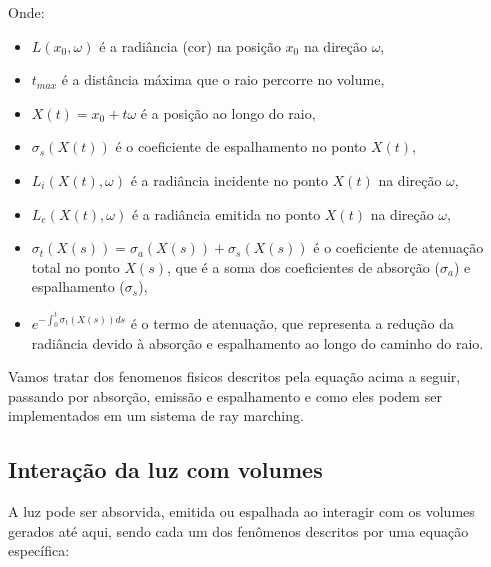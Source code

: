 Onde:
\begin{itemize}
  \item $L(x_0, \omega)$ é a radiância (cor) na posição $x_0$ na direção $\omega$,
  \item $t_{max}$ é a distância máxima que o raio percorre no volume,
  \item $X(t) = x_0 + t\omega$ é a posição ao longo do raio,
  \item $\sigma_s(X(t))$ é o coeficiente de espalhamento no ponto $X(t)$,
  \item $L_i(X(t), \omega)$ é a radiância incidente no ponto $X(t)$ na direção $\omega$,
  \item $L_e(X(t), \omega)$ é a radiância emitida no ponto $X(t)$ na direção $\omega$,
  \item $\sigma_t(X(s)) = \sigma_a(X(s)) + \sigma_s(X(s))$ é o coeficiente de atenuação total no ponto $X(s)$, que é a soma dos coeficientes de absorção ($\sigma_a$) e espalhamento ($\sigma_s$),
  \item $e^{-\int_{0}^{t} \sigma_t(X(s)) ds}$ é o termo de atenuação, que representa a redução da radiância devido à absorção e espalhamento ao longo do caminho do raio.
\end{itemize}

Vamos tratar dos fenomenos fisicos descritos pela equação acima a seguir, passando por absorção, emissão e espalhamento e como eles podem ser implementados em um sistema de ray marching.

\subsection{Interação da luz com volumes}

A luz pode ser absorvida, emitida ou espalhada ao interagir com os volumes gerados até aqui, sendo cada um dos fenômenos descritos por uma equação específica:

